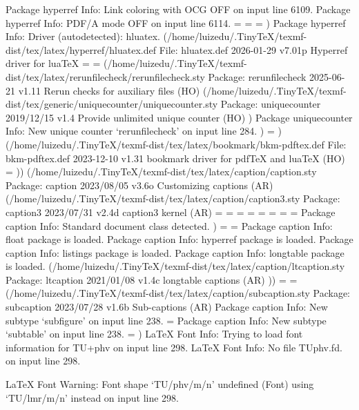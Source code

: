 Package hyperref Info: Link coloring with OCG OFF on input line 6109.
Package hyperref Info: PDF/A mode OFF on input line 6114.
\Hy@abspage=
\c@Item=
\c@Hfootnote=
)
Package hyperref Info: Driver (autodetected): hluatex.
(/home/luizedu/.TinyTeX/texmf-dist/tex/latex/hyperref/hluatex.def
File: hluatex.def 2026-01-29 v7.01p Hyperref driver for luaTeX
\Fld@listcount=
\c@bookmark@seq@number=
(/home/luizedu/.TinyTeX/texmf-dist/tex/latex/rerunfilecheck/rerunfilecheck.sty
Package: rerunfilecheck 2025-06-21 v1.11 Rerun checks for auxiliary files (HO)
(/home/luizedu/.TinyTeX/texmf-dist/tex/generic/uniquecounter/uniquecounter.sty
Package: uniquecounter 2019/12/15 v1.4 Provide unlimited unique counter (HO)
)
Package uniquecounter Info: New unique counter `rerunfilecheck' on input line 284.
)
\Hy@SectionHShift=
) (/home/luizedu/.TinyTeX/texmf-dist/tex/latex/bookmark/bkm-pdftex.def
File: bkm-pdftex.def 2023-12-10 v1.31 bookmark driver for pdfTeX and luaTeX (HO)
\BKM@id=
)) (/home/luizedu/.TinyTeX/texmf-dist/tex/latex/caption/caption.sty
Package: caption 2023/08/05 v3.6o Customizing captions (AR)
(/home/luizedu/.TinyTeX/texmf-dist/tex/latex/caption/caption3.sty
Package: caption3 2023/07/31 v2.4d caption3 kernel (AR)
\caption@tempdima=
\captionmargin=
\caption@leftmargin=
\caption@rightmargin=
\caption@width=
\caption@indent=
\caption@parindent=
\caption@hangindent=
Package caption Info: Standard document class detected.
)
\c@caption@flags=
\c@continuedfloat=
Package caption Info: float package is loaded.
Package caption Info: hyperref package is loaded.
Package caption Info: listings package is loaded.
Package caption Info: longtable package is loaded.
(/home/luizedu/.TinyTeX/texmf-dist/tex/latex/caption/ltcaption.sty
Package: ltcaption 2021/01/08 v1.4c longtable captions (AR)
))
\@float@every@codelisting=
\c@codelisting=
(/home/luizedu/.TinyTeX/texmf-dist/tex/latex/caption/subcaption.sty
Package: subcaption 2023/07/28 v1.6b Sub-captions (AR)
Package caption Info: New subtype `subfigure' on input line 238.
\c@subfigure=
Package caption Info: New subtype `subtable' on input line 238.
\c@subtable=
)
LaTeX Font Info:    Trying to load font information for TU+phv on input line 298.
LaTeX Font Info:    No file TUphv.fd. on input line 298.

LaTeX Font Warning: Font shape `TU/phv/m/n' undefined
(Font)              using `TU/lmr/m/n' instead on input line 298.


